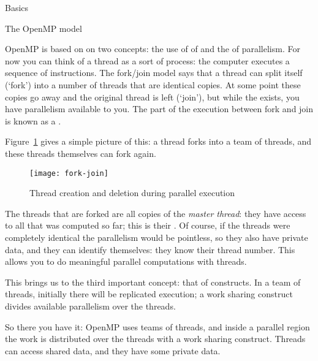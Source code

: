 
 {Basics}

 {The OpenMP model}

OpenMP is based on on two concepts: the use of of 
and the  of
parallelism. For now you can think of a thread as a sort of process:
the computer executes a sequence of instructions.
The fork/join model says that a thread can split itself (`fork')
into a number of threads that are identical copies. At some point
these copies go away and the original thread is left (`join'),
but while the  exists,
you have parallelism available to you. The part of the execution
between fork and join is known as a .

Figure~\ref{fig:forkjoin} gives a simple picture of this:
a thread forks into a team of threads, and these threads
themselves can fork again.
\begin{figure}[ht]
\texttt{[image: fork-join]}
\caption{Thread creation and deletion during parallel execution}
\label{fig:forkjoin}
\end{figure}

The threads that are forked are all copies of the
\emph{master thread}: they have access to all that was
computed so far; this is their .  Of course, if
the threads were completely identical the parallelism would be
pointless, so they also have private data, and they can identify
themselves: they know their thread number.  This allows you to do
meaningful parallel computations with threads.

This brings us to the third important concept: that of 
constructs. In a team of threads, initially there will be replicated execution;
a work sharing construct divides available parallelism over the threads.

So there you have it: OpenMP uses teams of threads, and inside
a parallel region the work is distributed over the threads with a work sharing construct.
Threads can access shared data, and they have some private data.

